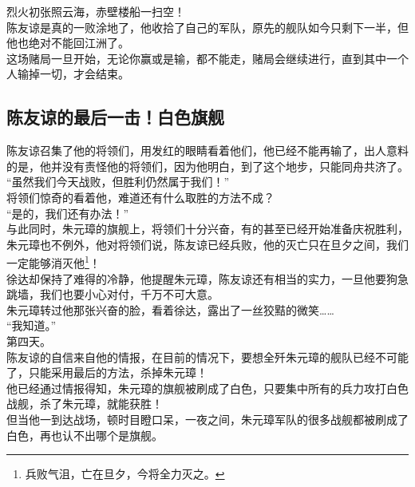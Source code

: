 \begin{multicols}{\theparacolNo}
烈火初张照云海，赤壁楼船一扫空！\\

陈友谅是真的一败涂地了，他收拾了自己的军队，原先的舰队如今只剩下一半，但他也绝对不能回江洲了。\\

这场赌局一旦开始，无论你赢或是输，都不能走，赌局会继续进行，直到其中一个人输掉一切，才会结束。\\

\subsection{陈友谅的最后一击！白色旗舰}
陈友谅召集了他的将领们，用发红的眼睛看着他们，他已经不能再输了，出人意料的是，他并没有责怪他的将领们，因为他明白，到了这个地步，只能同舟共济了。\\

“虽然我们今天战败，但胜利仍然属于我们！”\\

将领们惊奇的看着他，难道还有什么取胜的方法不成？\\

“是的，我们还有办法！”\\

与此同时，朱元璋的旗舰上，将领们十分兴奋，有的甚至已经开始准备庆祝胜利，朱元璋也不例外，他对将领们说，陈友谅已经兵败，他的灭亡只在旦夕之间，我们一定能够消灭他\footnote{兵败气沮，亡在旦夕，今将全力灭之。}！\\

徐达却保持了难得的冷静，他提醒朱元璋，陈友谅还有相当的实力，一旦他要狗急跳墙，我们也要小心对付，千万不可大意。\\

朱元璋转过他那张兴奋的脸，看着徐达，露出了一丝狡黠的微笑……\\

“我知道。”\\

第四天。\\

陈友谅的自信来自他的情报，在目前的情况下，要想全歼朱元璋的舰队已经不可能了，只能采用最后的方法，杀掉朱元璋！\\

他已经通过情报得知，朱元璋的旗舰被刷成了白色，只要集中所有的兵力攻打白色战舰，杀了朱元璋，就能获胜！\\

但当他一到达战场，顿时目瞪口呆，一夜之间，朱元璋军队的很多战舰都被刷成了白色，再也认不出哪个是旗舰。\\


\end{multicols}
